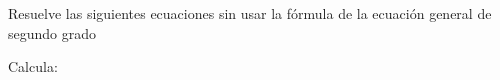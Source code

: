 \documentclass[addpoints,spanish, 12pt,a4paper]{exam}
\begin{document}
\begin{questions}



\question[1] Resuelve las siguientes ecuaciones sin usar la fórmula de la ecuación general de segundo grado

\question Calcula: 
\begin{parts}

\end{parts}
\end{questions}
\end{document}
